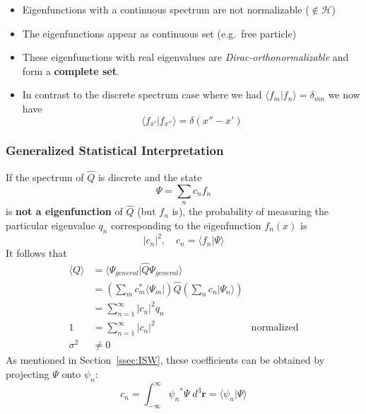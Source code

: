 
\begin{itemize}
    \item Eigenfunctions with a continuous spectrum are not normalizable ($\notin \mathcal{H}$)
    \item The eigenfunctions appear as continuous set (e.g.\ free particle)
    \item These eigenfunctions with real eigenvalues are \textit{Dirac-orthonormalizable} and form a \textbf{complete set}.
    \item In contrast to the discrete spectrum case where we had $\langle f_m|f_n\rangle=\delta_{mn}$ we now have
          \noindent\begin{equation*}
              \langle f_{x'}|f_{x''}\rangle=\delta(x''-x')
          \end{equation*}
\end{itemize}

\subsubsection{Generalized Statistical Interpretation}
If the spectrum of $\hat{Q}$ is discrete and the state
\begin{equation*}
    \Psi=\sum_n c_n f_n
\end{equation*}
is \textbf{not a eigenfunction} of $\hat{Q}$ (but $f_n$ is), the probability of measuring the particular eigenvalue $q_n$ corresponding to the eigenfunction $f_n(x)$ is
\noindent\begin{equation*}
    |c_n|^2, \quad c_n = \langle f_n|\Psi\rangle
\end{equation*}
It follows that
\noindent\begin{align*}
    \langle Q\rangle & = \langle\Psi_{general}|\hat{Q}\Psi_{general}\rangle                                                                 \\
                     & =\left(\sum_{m}c_{m}^{*}\langle\Psi_{m}|\right)\hat{Q}\left(\sum_{n}c_{n}|\Psi_{n}\rangle\right)                     \\
                     & = \sum_{n=1}^{\infty} |c_n|^2 q_n                                                                                    \\
    1                & =\sum_{n=1}^{\infty} |c_n|^2                                                                     & \text{normalized} \\
    \sigma^2         & \neq 0
\end{align*}
As mentioned in Section\ \ref{ssec:ISW}, these coefficients can be obtained by projecting $\Psi$ onto $\psi_n$:
\noindent\begin{equation*}
    c_n = \int_{-\infty}^{\infty} {\psi_n}^* \Psi\; d^3 \mathbf{r} = \langle \psi_n |\Psi \rangle
\end{equation*}

